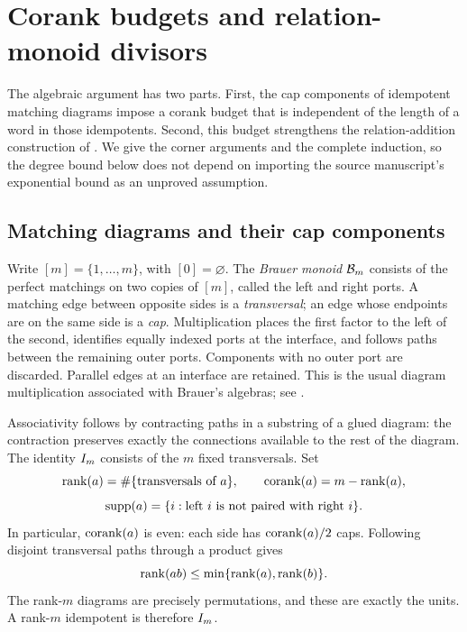 \section{Corank budgets and relation-monoid divisors}
\label{btc:alg:section}

The algebraic argument has two parts. First, the cap components of
idempotent matching diagrams impose a corank budget that is independent
of the length of a word in those idempotents. Second, this budget
strengthens the relation-addition construction of
\cite{OpenAILiveness2026}. We give the corner arguments and the complete
induction, so the degree bound below does not depend on importing the
source manuscript's exponential bound as an unproved assumption.

\subsection{Matching diagrams and their cap components}
\label{btc:alg:definitions}

Write $[m]=\{1,\ldots,m\}$, with $[0]=\varnothing$.
The \emph{Brauer monoid} $\mathcal{B}_{m}$ consists of the perfect matchings on
two copies of $[m]$, called the left and right ports. A matching edge
between opposite sides is a \emph{transversal}; an edge whose endpoints
are on the same side is a \emph{cap}. Multiplication places the first
factor to the left of the second, identifies equally indexed ports at
the interface, and follows paths between the remaining outer ports.
Components with no outer port are discarded. Parallel edges at an
interface are retained. This is the usual diagram multiplication
associated with Brauer's algebras; see
\cite{Brauer1937,Auinger2012,EastGray2017}.

Associativity follows by contracting paths in a substring of a glued
diagram: the contraction preserves exactly the connections available
to the rest of the diagram. The identity $I_m$ consists of the $m$
fixed transversals. Set
\[
 \operatorname{rank}(a)=\#\{\text{transversals of }a\},\qquad
 \operatorname{corank}(a)=m-\operatorname{rank}(a),
\]
\[
 \operatorname{supp}(a)=\{i:\text{left }i\text{ is not paired with right }i\}.
\]
In particular, $\operatorname{corank}(a)$ is even: each side has
$\operatorname{corank}(a)/2$ caps. Following disjoint transversal paths through a
product gives
\begin{equation}\label{btc:alg:rank-basic}
 \operatorname{rank}(ab)\le\min\{\operatorname{rank}(a),\operatorname{rank}(b)\}.
\end{equation}
The rank-$m$ diagrams are precisely permutations, and these are exactly
the units. A rank-$m$ idempotent is therefore $I_m$.

